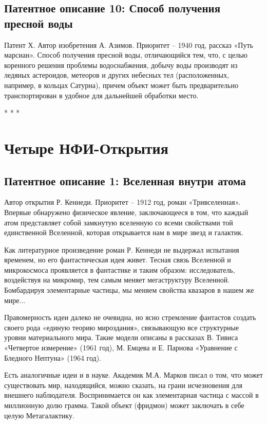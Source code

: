 \documentclass[11pt,a4paper]{article}
\begin{document}
\subsection*{Патентное описание 10: Способ получения пресной воды}
Патент Х. Автор изобретения А. Азимов. Приоритет -- 1940 год, рассказ «Путь
марсиан».  Способ получения пресной воды, отличающийся тем, что, с целью
коренного решения проблемы водоснабжения, добычу воды производят из ледяных
астероидов, метеоров и других небесных тел (расположенных, например, в кольцах
Сатурна), причем объект может быть предварительно транспортирован в удобное
для дальнейшей обработки место.

\begin{center}
  * * *
\end{center}
\section*{Четыре НФИ-Открытия}

\subsection*{Патентное описание 1: Вселенная внутри атома}
Автор открытия Р. Кеннеди. Приоритет -- 1912 год, роман «Тривселенная».
Впервые обнаружено физическое явление, заключающееся в том, что каждый атом
представляет собой замкнутую вселенную со всеми свойствами той единственной
Вселенной, которая открывается нам в мире звезд и галактик.

Как литературное произведение роман Р. Кеннеди не выдержал испытания временем,
но его фантастическая идея живет. Тесная связь Вселенной и микрокосмоса
проявляется в фантастике и таким образом: исследователь, воздействуя на
микромир, тем самым меняет мегаструктуру Вселенной. Бомбардируя элементарные
частицы, мы меняем свойства квазаров в нашем же мире...

Правомерность идеи далеко не очевидна, но ясно стремление фантастов создать
своего рода «единую теорию мироздания», связывающую все структурные уровни
материального мира. Такие модели описаны в рассказах В. Тивиса «Четвертое
измерение» (1961 год), М. Емцева и Е. Парнова «Уравнение с Бледного Нептуна»
(1964 год).

Есть аналогичные идеи и в науке. Академик М.А. Марков писал о том, что может
существовать мир, находящийся, можно сказать, на грани исчезновения для
внешнего наблюдателя. Воспринимается он как элементарная частица с массой в
миллионную долю грамма. Такой объект (фридмон) может заключать в себе целую
Метагалактику.
\end{document}
